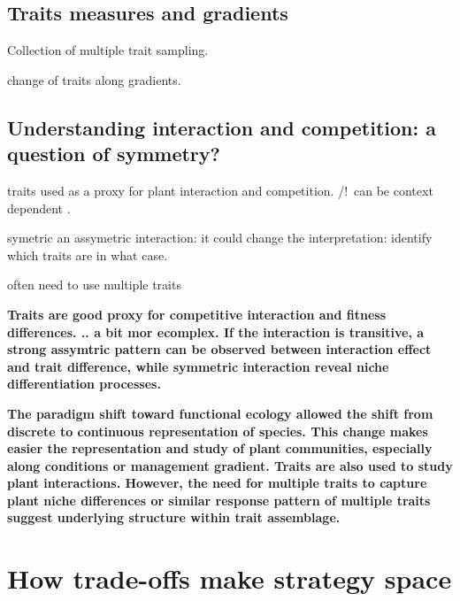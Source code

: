 \subsection{Traits measures and gradients}

Collection of multiple trait sampling.

change of traits along gradients.

\subsection{Understanding interaction and competition: a question of symmetry?}

traits used as a proxy for plant interaction and competition. /!\ can be context dependent \parencite{gallaway_2003}.

symetric an assymetric interaction: it could change the interpretation: identify which traits are in what case.


\parencite{kraft_functional_2008}
often need to use multiple traits \parencite{kraft_plant_2015}

\parencite{kunstler	}

\textbf{Traits are good proxy for competitive interaction and fitness differences. .. a bit mor ecomplex. If the interaction is transitive, a strong assymtric pattern can be observed between interaction effect and trait difference, while symmetric interaction reveal niche differentiation processes. }


\textbf{The paradigm shift toward functional ecology allowed the shift from discrete to continuous representation of species. This change makes easier the representation and study of plant communities, especially along conditions or management gradient. Traits are also used to study plant interactions. However, the need for multiple traits to capture plant niche differences or similar response pattern of multiple traits suggest underlying structure within trait assemblage.} 





\section{How trade-offs make strategy space}

